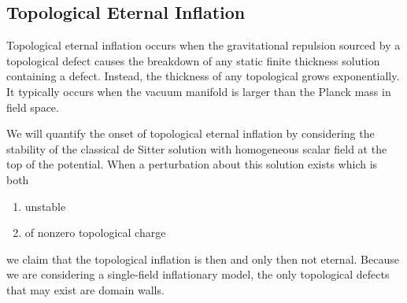 \documentclass[aps,amsfonts,amsmath,prd,preprint,nofootinbib,superscriptaddress]{revtex4}
\begin{document}
\begin{appendix}
\section{Topological Eternal Inflation}\label{sec:topo}
Topological eternal inflation \cite{Vilenkin:1994pv,Linde:1994wt} occurs when the gravitational repulsion sourced by a topological defect causes the breakdown of any static finite thickness solution containing a defect.  Instead, 
the thickness of any topological grows exponentially.  It typically \cite{Sakai:2003st}
occurs when the vacuum manifold is larger than the Planck mass in field space.  

We will quantify the onset of topological eternal inflation by considering the stability of the classical de Sitter solution with homogeneous scalar field at the top of the potential.  When a perturbation about this
solution exists which is both
\begin{enumerate}
\item unstable
\item of nonzero topological charge
 \end{enumerate}
 we claim that the topological inflation is then and only then not eternal.
Because we are considering a single-field inflationary model, the only topological defects that may exist are domain walls.  %






\end{appendix}
\end{document}
